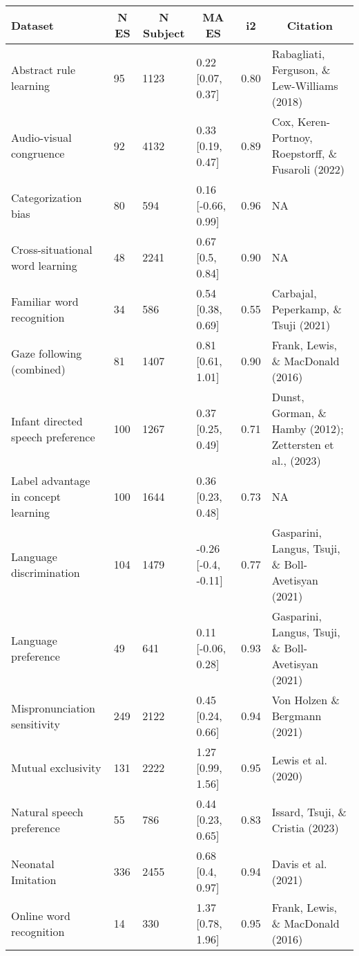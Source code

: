 \documentclass[
  man]{apa6}
\begin{document}
\begin{table*}[hbt]
\ifnextchar[{\eatarg}{}
[tbp]
\begin{landscape}
\begin{center}
\begin{threeparttable}
\small 
\caption{\label{tab:unnamed-chunk-9}}

\begin{tabular}{llllll}
\toprule
Dataset & \multicolumn{1}{c}{N ES} & \multicolumn{1}{c}{N Subject} & \multicolumn{1}{c}{MA ES} & \multicolumn{1}{c}{i2} & \multicolumn{1}{c}{Citation}\\
\midrule
Abstract rule learning & 95 & 1123 & 0.22 [0.07, 0.37] & 0.80 & Rabagliati, Ferguson, \& Lew-Williams (2018)\\
Audio-visual congruence & 92 & 4132 & 0.33 [0.19, 0.47] & 0.89 & Cox, Keren-Portnoy, Roepstorff, \& Fusaroli (2022)\\
Categorization bias & 80 & 594 & 0.16 [-0.66, 0.99] & 0.96 & NA\\
Cross-situational word learning & 48 & 2241 & 0.67 [0.5, 0.84] & 0.90 & NA\\
Familiar word recognition & 34 & 586 & 0.54 [0.38, 0.69] & 0.55 & Carbajal, Peperkamp, \& Tsuji (2021)\\
Gaze following (combined) & 81 & 1407 & 0.81 [0.61, 1.01] & 0.90 & Frank, Lewis, \& MacDonald (2016)\\
Infant directed speech preference & 100 & 1267 & 0.37 [0.25, 0.49] & 0.71 & Dunst, Gorman, \& Hamby (2012); Zettersten et al., (2023)\\
Label advantage in concept learning & 100 & 1644 & 0.36 [0.23, 0.48] & 0.73 & NA\\
Language discrimination & 104 & 1479 & -0.26 [-0.4, -0.11] & 0.77 & Gasparini, Langus, Tsuji, \& Boll-Avetisyan (2021)\\
Language preference & 49 & 641 & 0.11 [-0.06, 0.28] & 0.93 & Gasparini, Langus, Tsuji, \& Boll-Avetisyan (2021)\\
Mispronunciation sensitivity & 249 & 2122 & 0.45 [0.24, 0.66] & 0.94 & Von Holzen \& Bergmann (2021)\\
Mutual exclusivity & 131 & 2222 & 1.27 [0.99, 1.56] & 0.95 & Lewis et al. (2020)\\
Natural speech preference & 55 & 786 & 0.44 [0.23, 0.65] & 0.83 & Issard, Tsuji, \& Cristia (2023)\\
Neonatal Imitation & 336 & 2455 & 0.68 [0.4, 0.97] & 0.94 & Davis et al. (2021)\\
Online word recognition & 14 & 330 & 1.37 [0.78, 1.96] & 0.95 & Frank, Lewis, \& MacDonald (2016)\\

\end{tabular}
\end{threeparttable}
\end{center}
\end{landscape}
\end{table*}
\end{document}
